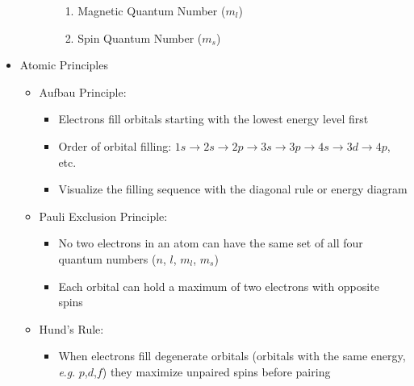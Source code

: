 \begin{itemize}
\begin{itemize}
\begin{itemize}
\begin{enumerate}
              \item Magnetic Quantum Number ($m_l$)

              \item Spin Quantum Number ($m_s$)

            \end{enumerate}

        \end{itemize}
        
    \end{itemize}

  \item Atomic Principles

    \begin{itemize}

      \item Aufbau Principle:

        \begin{itemize}

          \item Electrons fill orbitals starting with the lowest energy level first

          \item Order of orbital filling: $1s\to2s\to2p\to3s\to3p\to4s\to3d\to4p$, etc.

          \item Visualize the filling sequence with the diagonal rule or energy diagram

        \end{itemize}

      \item Pauli Exclusion Principle:

        \begin{itemize}

          \item No two electrons in an atom can have the same set of all four quantum numbers ($n$, $l$, $m_l$, $m_s$)

          \item Each orbital can hold a maximum of two electrons with opposite spins

        \end{itemize}

      \item Hund's Rule:

        \begin{itemize}

          \item When electrons fill degenerate orbitals (orbitals with the same energy, \textit{e}.\textit{g}. $p$,$d$,$f$) they maximize unpaired spins before pairing


\end{itemize}
\end{itemize}
\end{itemize}
